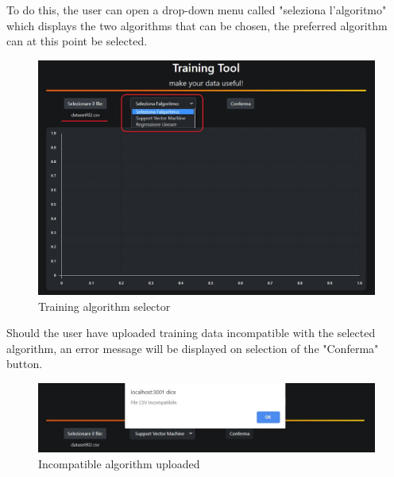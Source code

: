 To do this, the user can open a drop-down menu called "seleziona l'algoritmo" which displays the two algorithms that can be chosen, the preferred algorithm can at this point be selected.
\begin{figure}[H]
\centering
\includegraphics[scale=0.65]{img/tool/algo_selector.jpg}
\caption{Training algorithm selector}
\end{figure}
Should the user have uploaded training data incompatible with the selected algorithm, an error message will be displayed on selection of the "Conferma" button.\newline
\begin{figure}[H]
\centering
\includegraphics[scale=0.65]{img/tool/err_msg_algo.jpg}
\caption{Incompatible algorithm uploaded}
\end{figure}
\newpage
